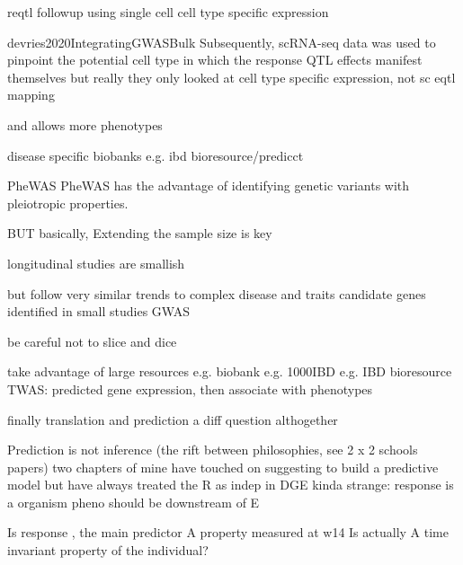 \begin{outline}
        reqtl followup using single cell cell type specific expression

        devries2020IntegratingGWASBulk
        Subsequently, scRNA-seq data was used to pinpoint the potential cell type in which the response QTL effects manifest themselves
            but really they only looked at cell type specific expression, not sc eqtl mapping

and allows
more phenotypes
        
        disease specific biobanks e.g. ibd bioresource/predicct


    PheWAS\autocite{verma2017CurrentScopeChallenges}
    PheWAS has the advantage of identifying genetic variants with pleiotropic properties.

BUT basically, Extending the sample size is key

    longitudinal studies are smallish

    but follow very similar trends to complex disease and traits
        candidate genes identified in small studies
        GWAS

    be careful not to slice and dice

    take advantage of large resources
    e.g. biobank
    e.g. 1000IBD
    e.g. IBD bioresource
        TWAS: predicted gene expression, then associate with phenotypes

finally translation and prediction
    a diff question althogether

    Prediction is not inference (the rift between philosophies, see 2 x 2 schools papers)
        two chapters of mine
            have touched on suggesting to build a predictive model
        but have always treated the R as indep in DGE
        kinda strange: response is a organism pheno should be downstream of E

            Is response , the main predictor
            A property measured at w14
            Is actually A time invariant property of the individual?


\end{outline}
